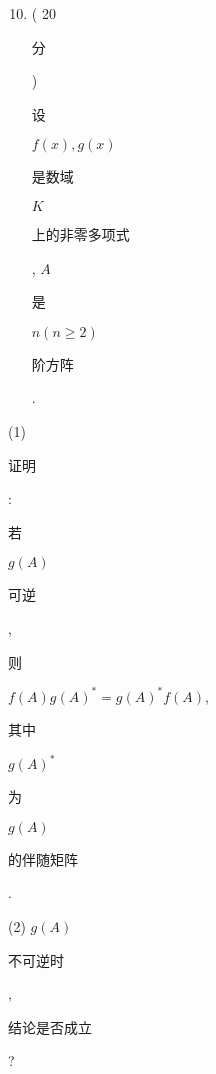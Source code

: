 \documentclass[10pt]{article}
\begin{document}
\begin{enumerate}
  \setcounter{enumi}{9}
  \item ( 20 \begin{CJK}{UTF8}{mj}分\end{CJK}) \begin{CJK}{UTF8}{mj}设\end{CJK} $f(x), g(x)$ \begin{CJK}{UTF8}{mj}是数域\end{CJK} $K$ \begin{CJK}{UTF8}{mj}上的非零多项式\end{CJK}, $A$ \begin{CJK}{UTF8}{mj}是\end{CJK} $n(n \geq 2)$ \begin{CJK}{UTF8}{mj}阶方阵\end{CJK}.
\end{enumerate}
(1) \begin{CJK}{UTF8}{mj}证明\end{CJK}: \begin{CJK}{UTF8}{mj}若\end{CJK} $g(A)$ \begin{CJK}{UTF8}{mj}可逆\end{CJK}, \begin{CJK}{UTF8}{mj}则\end{CJK} $f(A) g(A)^{*}=g(A)^{*} f(A)$, \begin{CJK}{UTF8}{mj}其中\end{CJK} $g(A)^{*}$ \begin{CJK}{UTF8}{mj}为\end{CJK} $g(A)$ \begin{CJK}{UTF8}{mj}的伴随矩阵\end{CJK}.

(2) $g(A)$ \begin{CJK}{UTF8}{mj}不可逆时\end{CJK}, \begin{CJK}{UTF8}{mj}结论是否成立\end{CJK}?
\end{document}
